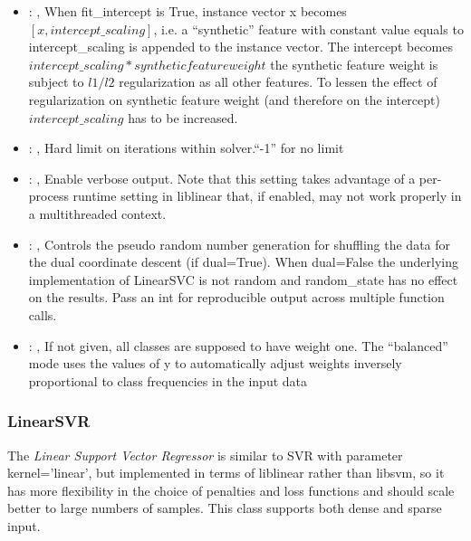 \begin{itemize}
    \item {}: , 
      When fit\_intercept is True, instance vector x becomes $[x, intercept\_scaling]$,
      i.e. a “synthetic” feature with constant value equals to intercept\_scaling is appended
      to the instance vector. The intercept becomes $intercept\_scaling * synthetic feature weight$
      \nb the synthetic feature weight is subject to $l1/l2$ regularization as all other features.
      To lessen the effect of regularization on synthetic feature weight (and therefore on the
      intercept)                                                  $intercept\_scaling$ has to be
      increased.

    \item {}: , 
      Hard limit on iterations within solver.``-1'' for no limit

    \item {}: , 
      Enable verbose output. Note that this setting takes advantage
      of a per-process runtime setting in liblinear that, if enabled, may not
      work properly in a multithreaded context.

    \item {}: , 
      Controls the pseudo random number generation for shuffling
      the data for the dual coordinate descent (if dual=True). When dual=False
      the underlying implementation of LinearSVC is not random and
      random\_state has no effect on the results. Pass an int for reproducible
      output across multiple function calls.

    \item {}: \xmlDesc{[balanced]}, 
      If not given, all classes are supposed to have weight one.
      The “balanced” mode uses the values of y to automatically adjust weights
      inversely proportional to class frequencies in the input data
  \end{itemize}


\subsubsection{LinearSVR}
  The  \textit{Linear Support Vector Regressor} is
  similar to SVR with parameter kernel=’linear’, but implemented in terms of liblinear rather than
  libsvm,                             so it has more flexibility in the choice of penalties and loss
  functions and should scale better to large numbers of samples.                             This
  class supports both dense and sparse input.

